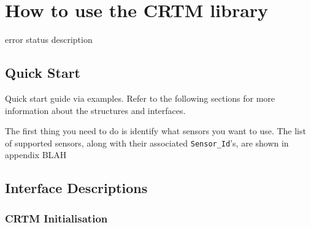 \chapter{How to use the CRTM library}

error status description

\section{Quick Start}

Quick start guide via examples. Refer to the following sections for more information about the structures and interfaces.

The first thing you need to do is identify what sensors you want to use. The list of supported sensors, along with their associated \texttt{Sensor\_Id}'s, are shown in appendix BLAH




\section{Interface Descriptions}

\subsection{CRTM Initialisation}

